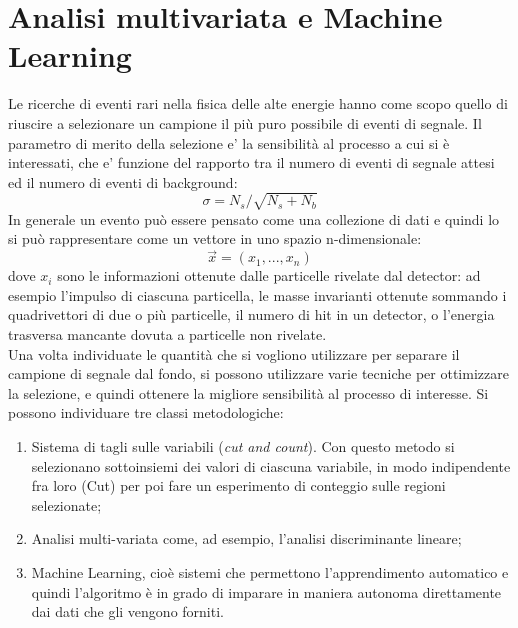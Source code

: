\section{Analisi multivariata e Machine Learning}
\label{analisi multivariata e ML}

Le ricerche di eventi rari nella fisica delle alte energie hanno come scopo quello di riuscire a selezionare un campione il più puro possibile di eventi di segnale. Il parametro di merito della selezione e' la sensibilità al processo a cui si è interessati, che e' funzione del rapporto tra il numero di eventi di segnale attesi ed il numero di eventi di background: 
\begin{equation}
	\sigma = N_s/\sqrt{N_s + N_b}
\end{equation}
In generale un evento può essere pensato come una collezione di dati e quindi lo si può rappresentare come un vettore in uno spazio n-dimensionale: 
\begin{equation}
\vec{x} = (x_{1},...,x_{n})
\end{equation}
dove $x_i$ sono le informazioni ottenute dalle particelle rivelate dal detector: ad esempio l'impulso di ciascuna particella, le masse invarianti ottenute sommando i quadrivettori di due o più particelle, il numero di hit in un detector, o l'energia trasversa mancante dovuta a particelle non rivelate. \\
Una volta individuate le quantità che si vogliono utilizzare per separare il campione di segnale dal fondo, si possono utilizzare varie tecniche per ottimizzare la selezione, e quindi ottenere la migliore sensibilità al processo di interesse. Si possono individuare tre classi metodologiche:

\begin{enumerate}
	\item Sistema di tagli sulle variabili (\textit{cut and count}). Con questo metodo si selezionano sottoinsiemi dei valori di ciascuna variabile, in modo indipendente fra loro (Cut) per poi fare un esperimento di conteggio sulle regioni selezionate;
	\item Analisi multi-variata come, ad esempio, l'analisi discriminante lineare;
	\item Machine Learning, cioè sistemi che permettono l'apprendimento automatico e quindi l'algoritmo è in grado di imparare in maniera autonoma direttamente dai dati che gli vengono forniti.
\end{enumerate}

\newpage

